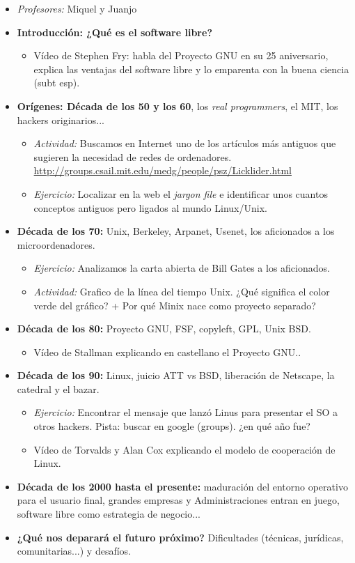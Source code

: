 \documentclass[a4paper,12pt]{article}
\begin{document}
\begin{itemize}
\item \textit{Profesores:} Miquel y Juanjo
\item \textbf{Introducción: ¿Qué es el software libre?} 
	\begin{itemize}
	\item Vídeo de Stephen Fry: habla del Proyecto GNU en su 25 aniversario, explica las ventajas del software libre y lo emparenta con la buena ciencia (subt esp). 
	\end{itemize}
\item \textbf{Orígenes: Década de los 50 y los 60}, los \textit{real programmers}, el MIT, los hackers originarios...
	\begin{itemize}
	\item \textit{Actividad:} Buscamos en Internet uno de los artículos más antiguos que sugieren la necesidad de redes de ordenadores. \url{http://groups.csail.mit.edu/medg/people/psz/Licklider.html}
	\item \textit{Ejercicio:} Localizar en la web el \textit{jargon file} e identificar unos cuantos conceptos antiguos pero ligados al mundo Linux/Unix. 
	\end{itemize}
\item \textbf{Década de los 70:} Unix, Berkeley, Arpanet, Usenet, los aficionados a los microordenadores.
	\begin{itemize}
	\item \textit{Ejercicio:} Analizamos la carta abierta de Bill Gates a los aficionados.
	\item \textit{Actividad:} Grafico de la línea del tiempo Unix. ¿Qué significa el color verde del gráfico? + Por qué Minix nace como proyecto separado?
	\end{itemize}
\item \textbf{Década de los 80:} Proyecto GNU, FSF, copyleft, GPL, Unix BSD.
	\begin{itemize}
	\item Vídeo de Stallman explicando en castellano el Proyecto GNU.. 
	\end{itemize}
\item \textbf{Década de los 90:} Linux, juicio ATT vs BSD, liberación de Netscape, la catedral y el bazar.
	\begin{itemize}
	\item \textit{Ejercicio:} Encontrar el mensaje que lanzó Linus para presentar el SO a otros hackers. Pista: buscar en google (groups). ¿en qué año fue?
	\item Vídeo de Torvalds y Alan Cox explicando el modelo de cooperación de Linux. 
	\end{itemize}
\item \textbf{Década de los 2000 hasta el presente:} maduración del entorno operativo para el usuario final, grandes empresas y Administraciones entran en juego, software libre como estrategia de negocio...
\item \textbf{¿Qué nos deparará el futuro próximo?} Dificultades (técnicas, jurídicas, comunitarias...) y desafíos.
\end{itemize}
\end{document}

